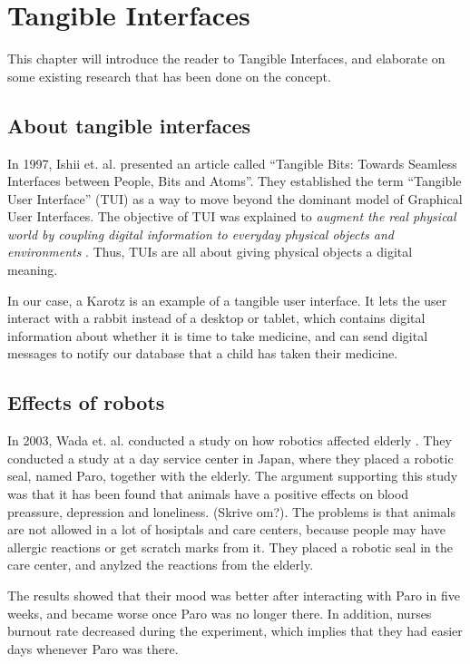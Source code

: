 \chapter{Tangible Interfaces}
\label{chp:tangibleinterfaces}

This chapter will introduce the reader to Tangible Interfaces, and elaborate on some existing research that has been done on the concept.   

\section{About tangible interfaces}

In 1997, Ishii et. al. presented an article called ``Tangible Bits: Towards Seamless Interfaces between People, Bits and Atoms''. They established the term ``Tangible User Interface'' (TUI) as a way to move beyond the dominant model of Graphical User Interfaces. The objective of TUI was explained to \emph{augment the real physical world by coupling digital information to everyday physical objects and environments} \cite{ishii1997tangible}. Thus, TUIs are all about giving physical objects a digital meaning.   


In our case, a Karotz is an example of a tangible user interface. It lets the user interact with a rabbit instead of a desktop or tablet, which contains digital information about whether it is time to take medicine, and can send digital messages to notify our database that a child has taken their medicine.      


\section{Effects of robots}

In 2003, Wada et. al. conducted a study on how robotics affected elderly \cite{wada2004effects}. They conducted a study at a day service center in Japan, where they placed a robotic seal, named Paro, together with the elderly. The argument supporting this study was that it has been found that animals have a positive effects on blood preassure, depression and loneliness. (Skrive om?). The problems is that animals are not allowed in a lot of hosiptals and care centers, because people may have allergic reactions or get scratch marks from it. They placed a robotic seal in the care center, and anylzed the reactions from the elderly. 

The results showed that their mood was better after interacting with Paro in five weeks, and became worse once Paro was no longer there. In addition, nurses burnout rate decreased during the experiment, which implies that they had easier days whenever Paro was there.          

